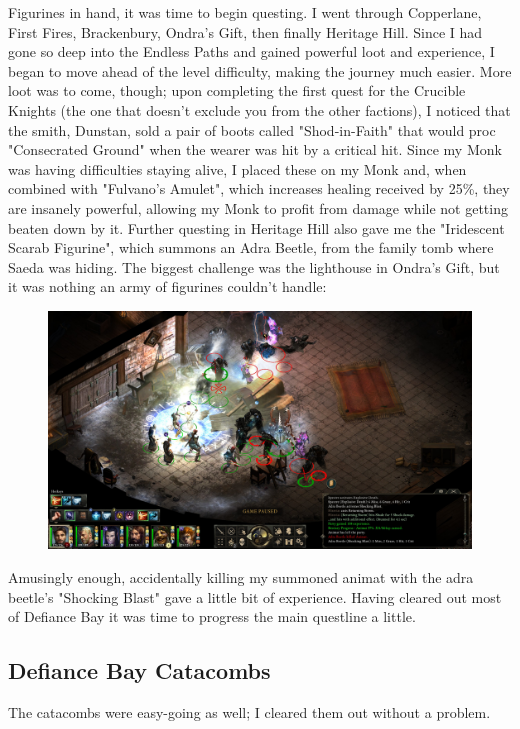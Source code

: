 \documentclass{article}
\begin{document}
Figurines in hand, it was time to begin questing.  I went through Copperlane, First Fires, Brackenbury, Ondra's Gift, then finally Heritage Hill.  Since I had gone so deep into the Endless Paths and gained powerful loot and experience, I began to move ahead of the level difficulty, making the journey much easier.  More loot was to come, though; upon completing the first quest for the Crucible Knights (the one that doesn't exclude you from the other factions), I noticed that the smith, Dunstan, sold a pair of boots called "Shod-in-Faith" that would proc "Consecrated Ground" when the wearer was hit by a critical hit.  Since my Monk was having difficulties staying alive, I placed these on my Monk and, when combined with "Fulvano's Amulet", which increases healing received by 25\%, they are insanely powerful, allowing my Monk to profit from damage while not getting beaten down by it.  Further questing in Heritage Hill also gave me the "Iridescent Scarab Figurine", which summons an Adra Beetle, from the family tomb where Saeda was hiding.  The biggest challenge was the lighthouse in Ondra's Gift, but it was nothing an army of figurines couldn't handle:

\begin{figure}
\includegraphics[scale=0.33]{files/blog/2018_11_25_pillars_of_eternity_path_of_the_damned_act_ii/2018_11_25_lighthouse.jpg}
\end{figure}

Amusingly enough, accidentally killing my summoned animat with the adra beetle's "Shocking Blast" gave a little bit of experience.  Having cleared out most of Defiance Bay it was time to progress the main questline a little.

\subsection{Defiance Bay Catacombs}
The catacombs were easy-going as well; I cleared them out without a problem.
\end{document}
